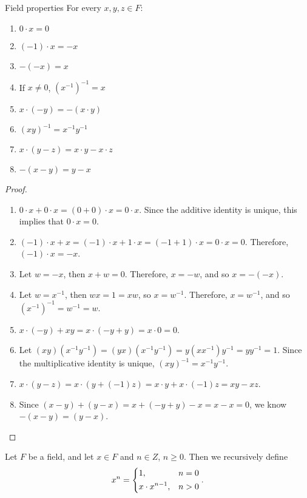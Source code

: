 \begin{thm}{Field properties}\label{field-properties}\proofbreak
    For every $x, y, z \in F$:
    \begin{enumerate}
        \item $0 \cdot x = 0$
        \item $(-1) \cdot x = -x$
        \item $-(-x) = x$
        \item If $x \neq 0$, $\left(x^{-1}\right)^{-1} = x$
        \item $x \cdot (-y) = -(x\cdot y)$
        \item $(xy)^{-1} = x^{-1}y^{-1}$
        \item $x\cdot(y-z) = x\cdot y - x \cdot z$
        \item $-(x - y) = y - x$
    \end{enumerate}
\end{thm}

\begin{proof}\proofbreak
    \begin{enumerate}
        \item $0 \cdot x + 0 \cdot x = (0 + 0) \cdot x = 0 \cdot x$. Since the additive identity is unique, this implies that $0 \cdot x = 0$.
        \item $(-1) \cdot x + x = (-1) \cdot x + 1 \cdot x = (-1 + 1) \cdot x = 0 \cdot x = 0$. Therefore, $(-1) \cdot x = -x$.
        \item Let $w = -x$, then $x + w = 0$. Therefore, $x = -w$, and so $x = -(-x)$.
        \item Let $w = x^{-1}$, then $wx = 1 = xw$, so $x = w^{-1}$. Therefore, $x = w^{-1}$, and so $(x^{-1})^{-1} = w^{-1} = w$.
        \item $x \cdot (-y) + xy = x\cdot(-y + y) = x\cdot 0 = 0$.
        \item Let $(xy)(x^{-1}y^{-1}) = (yx)(x^{-1}y^{-1}) = y(xx^{-1})y^{-1} = yy^{-1} = 1$. Since the multiplicative identity is unique, $(xy)^{-1} = x^{-1}y^{-1}$.
        \item $x \cdot (y-z) = x \cdot (y + (-1)z) = x\cdot y + x \cdot (-1)z = xy - xz$.
        \item Since $(x - y) + (y-x) = x + (-y + y) - x = x - x = 0$, we know $-(x - y) = (y - x)$.
    \end{enumerate}
\end{proof}

\begin{defn}
    Let $F$ be a field, and let $x \in F$ and $n \in Z$, $n \geq 0$. Then we recursively define
    \[x^n =
        \begin{dcases}
            1, & n = 0 \\
            x \cdot x^{n-1}, & n > 0
        \end{dcases}.
    \]
\end{defn}

